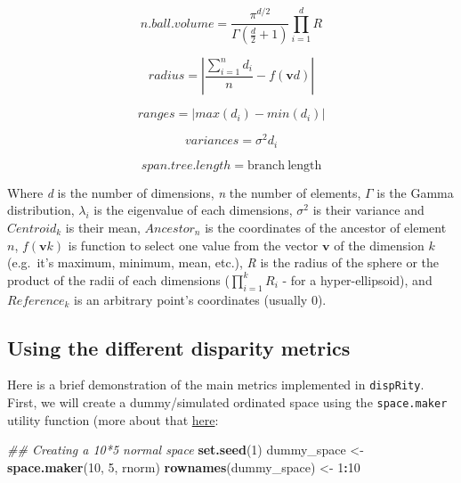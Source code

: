 \documentclass[]{book}
\newenvironment{Shaded}{\begin{snugshade}}{\end{snugshade}}
\newcommand{\CommentTok}[1]{\textcolor[rgb]{0.56,0.35,0.01}{\textit{#1}}}
\newcommand{\DecValTok}[1]{\textcolor[rgb]{0.00,0.00,0.81}{#1}}
\newcommand{\KeywordTok}[1]{\textcolor[rgb]{0.13,0.29,0.53}{\textbf{#1}}}
\newcommand{\NormalTok}[1]{#1}
\newcommand{\OperatorTok}[1]{\textcolor[rgb]{0.81,0.36,0.00}{\textbf{#1}}}
\newcommand{\StringTok}[1]{\textcolor[rgb]{0.31,0.60,0.02}{#1}}
\begin{document}
\begin{equation}
    n.ball.volume = \frac{\pi^{d/2}}{\Gamma(\frac{d}{2}+1)}\displaystyle\prod_{i=1}^{d} R
\end{equation}

\begin{equation}
    radius = |\frac{\sum_{i=1}^{n}d_i}{n} - f(\mathbf{v}d)|
\end{equation}

\begin{equation}
    ranges = |max(d_i) - min(d_i)|
\end{equation}

\begin{equation}
    variances = \sigma^{2}{d_i}
\end{equation}

\begin{equation}
    span.tree.length = \mathrm{branch\ length}
\end{equation}

Where \emph{d} is the number of dimensions,
\emph{n} the number of elements,
\(\Gamma\) is the Gamma distribution,
\(\lambda_i\) is the eigenvalue of each dimensions,
\(\sigma^{2}\) is their variance and
\(Centroid_{k}\) is their mean,
\(Ancestor_{n}\) is the coordinates of the ancestor of element \(n\),
\(f(\mathbf{v}k)\) is function to select one value from the vector \(\mathbf{v}\) of the dimension \(k\) (e.g.~it's maximum, minimum, mean, etc.),
\emph{R} is the radius of the sphere or the product of the radii of each dimensions (\(\displaystyle\prod_{i=1}^{k}R_{i}\) - for a hyper-ellipsoid),
and \(Reference_{k}\) is an arbitrary point's coordinates (usually 0).

\hypertarget{using-the-different-disparity-metrics}{%
\subsection{Using the different disparity metrics}\label{using-the-different-disparity-metrics}}

Here is a brief demonstration of the main metrics implemented in \texttt{dispRity}.
First, we will create a dummy/simulated ordinated space using the \texttt{space.maker} utility function (more about that \protect\hyperlink{space.maker}{here}:

\begin{Shaded}
\begin{Highlighting}[]
\CommentTok{## Creating a 10*5 normal space}
\KeywordTok{set.seed}\NormalTok{(}\DecValTok{1}\NormalTok{)}
\NormalTok{dummy_space <-}\StringTok{ }\KeywordTok{space.maker}\NormalTok{(}\DecValTok{10}\NormalTok{, }\DecValTok{5}\NormalTok{, rnorm)}
\KeywordTok{rownames}\NormalTok{(dummy_space) <-}\StringTok{ }\DecValTok{1}\OperatorTok{:}\DecValTok{10}
\end{Highlighting}
\end{Shaded}
\end{document}
